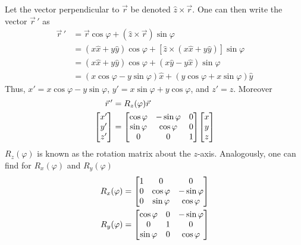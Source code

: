 \documentclass[12pt,a4paper,titlepage]{article}
\begin{document}
\begin{center}
\end{center}
Let the vector perpendicular to $\vec{r}$ be denoted $\hat{z}\times\vec{r}$. One can then write the vector $\vec{r}\,'$ as
\begin{equation}
\begin{aligned}
\vec{r}\,'&=\vec{r}\cos\varphi+(\hat{z}\times\vec{r})\sin\varphi\\
&=(x\hat{x}+y\hat{y})\cos\varphi+[\hat{z}\times(x\hat{x}+y\hat{y})]\sin\varphi\\
&=(x\hat{x}+y\hat{y})\cos\varphi+(x\hat{y}-y\hat{x})\sin\varphi\\
&=(x\cos\varphi-y\sin\varphi)\hat{x}+(y\cos\varphi+x\sin\varphi)\hat{y}
\end{aligned}
\end{equation}
Thus, $x'=x\cos\varphi-y\sin\varphi$, $y'=x\sin\varphi+y\cos\varphi$, and $z'=z$. Moreover
\begin{equation}
\begin{aligned}
\vec{r}\,'&=R_{z}(\varphi)\vec{r}\\
\mqty[x'\\y'\\z']&=\mqty[\cos\varphi & -\sin\varphi & 0\\ \sin\varphi & \cos\varphi & 0 \\ 0 & 0 & 1]\mqty[x\\y\\z]
\end{aligned}
\end{equation}
$R_{z}(\varphi)$ is known as the rotation matrix about the $z$-axis. Analogously, one can find for $R_{x}(\varphi)$ and $R_{y}(\varphi)$
\begin{equation}
\begin{aligned}
R_{x}(\varphi)&=\mqty[1 & 0 & 0 \\ 0 & \cos\varphi & -\sin\varphi \\ 0 & \sin\varphi & \cos\varphi]\\
R_{y}(\varphi)&=\mqty[\cos\varphi & 0 & -\sin\varphi \\ 0 & 1 & 0 \\ \sin\varphi & 0 & \cos\varphi]
\end{aligned}
\end{equation}
\end{document}
